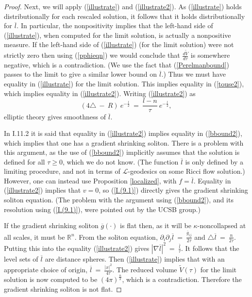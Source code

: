 \documentclass[12pt]{amsart}
\newcommand{\R}{{\mathbb R}}
\numberwithin{equation}{section}
\theoremstyle{plain}
\theoremstyle{definition}
\theoremstyle{remark}
\begin{document}
\begin{proof}
Next, we will apply (\ref{illustrate}) and (\ref{illustrate2}).
As (\ref{illustrate}) holds distributionally
for each rescaled solution, it follows that
it holds distributionally for $\overline{l}$. In particular, the
nonpositivity implies that the left-hand side of (\ref{illustrate}), when
computed for the limit solution, is actually a nonpositive measure.
If the left-hand side of
(\ref{illustrate}) (for the limit solution)
were not strictly zero then using (\ref{pphieqn})  we would conclude
that $\frac{d\tilde{V}}{d\tau}$ 
is somewhere negative, which is a contradiction.
(We use the fact that (\ref{Perelmanbound}) passes to the limit
to give a similar lower bound on $\overline{l}$.)
Thus we must have equality in (\ref{illustrate}) for the limit solution.
This implies equality in (\ref{touse2}),
which implies equality in  (\ref{illustrate2}).
Writing
 (\ref{illustrate2}) as
\begin{equation}
(4 \triangle \: - \: R) \: e^{-\frac{l}{2}} \: = \:
\frac{l-n}{\tau} \: e^{-\frac{l}{2}},
\end{equation}
elliptic theory gives smoothness of $\overline{l}$. 

In I.11.2 it is said that equality in  (\ref{illustrate2}) implies equality
in (\ref{bbound2}), which implies that one has a gradient shrinking soliton.
There is a problem with this argument, as the use of (\ref{bbound2})
implicitly
assumes that the solution is defined for all $\tau \ge 0$, which we do not
know. (The function $\overline{l}$ is only defined by a limiting
procedure, and not in terms of ${\mathcal L}$-geodesics on some
Ricci flow solution.) However, one can instead use Proposition \ref{localized}, with 
$f = \overline{l}$. 
Equality in (\ref{illustrate2}) implies that $v = 0$, so (\ref{I.(9.1)})
directly gives the gradient shrinking soliton equation.
(The problem with the argument using (\ref{bbound2}), and its resolution using
(\ref{I.(9.1)}), were pointed out by the UCSB group.)

If the gradient shrinking soliton $\overline{g}(\cdot)$ is
flat then, as it will be $\kappa$-noncollapsed
at all scales, it must be $\R^n$. From the soliton equation,
$\partial_i \partial_j \overline{l} \: = \:
\frac{\overline{g}_{ij}}{2\tau}$ and 
$\triangle \overline{l} \: = \: \frac{n}{2\tau}$. Putting this
into the equality (\ref{illustrate2}) gives
$|\nabla \overline{l}|^2 \: = \: \frac{\overline{l}}{\tau}$. 
It follows that the level sets of $\overline{l}$ are distance spheres.
Then (\ref{illustrate}) implies
that with an appropriate choice of
origin,  
$\overline{l} \: = \: \frac{|x|^2}{4\tau}$.  The reduced volume
$\tilde{V}(\tau)$ for the limit solution is now computed to be
$(4 \pi)^{\frac{n}{2}}$, which is a contradiction.  Therefore the
gradient shrinking soliton is not flat.
\end{proof}
\end{document}
